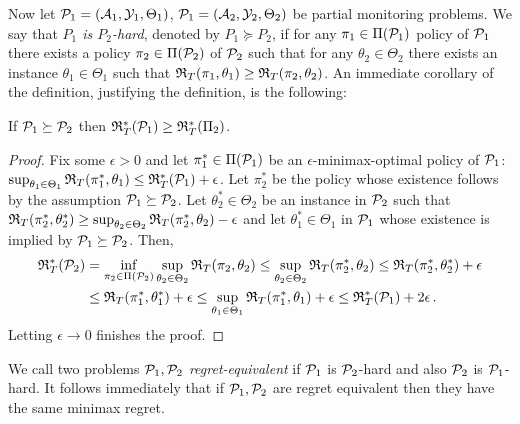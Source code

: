Now let $\P_1 = (\A_1,\Y_1,\Theta_1)$, $\P_1 = (\A_2,\Y_2,\Theta_2)$ be partial monitoring problems.
We say that \emph{$P_1$ is $P_2$-hard}, 
denoted by $P_1 \succeq P_2$, if for any $\pi_1\in \Pi(\P_1)$ policy of $\P_1$ there exists a policy $\pi_2\in \Pi(\P_2)$ of $\P_2$
such that for any $\theta_2\in \Theta_2$ there exists an instance $\theta_1\in \Theta_1$ such that $\Regret_T(\pi_1,\theta_1)\ge \Regret_T(\pi_2,\theta_2)$. An immediate corollary of the definition, justifying the definition, is the following:
\begin{proposition}
If $\P_1\succeq \P_2$ then $\Regret_T^*(\P_1)\ge \Regret_T^*(\Pi_2)$.
\end{proposition}
\begin{proof}
Fix some $\epsilon>0$ and 
let $\pi_1^*\in \Pi(\P_1)$ be an $\epsilon$-minimax-optimal policy of $\P_1$: 
$\sup_{\theta_1\in\Theta_1} \Regret_T(\pi_1^*,\theta_1) \le \Regret_T^*(\P_1)+\epsilon$.
Let $\pi_2^*$ be the policy whose existence follows by the assumption $\P_1\succeq \P_2$.
Let $\theta_2^*\in \Theta_2$ be an instance in $\P_2$ such that 
$\Regret_T(\pi_2^*,\theta_2^*)\ge \sup_{\theta_2\in \Theta_2} \Regret_T(\pi_2^*,\theta_2)-\epsilon$
and let $\theta_1^*\in \Theta_1$ in $\P_1$ whose existence is implied by $\P_1\succeq \P_2$.
Then,
\begin{align*}
 \Regret_T^*(\P_2) &= 
\inf_{\pi_2\in \Pi(\P_2)} \sup_{\theta_2\in \Theta_2} \Regret_T(\pi_2,\theta_2)
\le \sup_{\theta_2\in \Theta_2} \Regret_T(\pi_2^*,\theta_2) 
\le  \Regret_T(\pi_2^*,\theta_2^*)+\epsilon \\
& \le  \Regret_T(\pi_1^*,\theta_1^*)+\epsilon
\le \sup_{\theta_1\in \Theta_1} \Regret_T(\pi_1^*,\theta_1)+\epsilon
\le \Regret_T^*(\P_1) +2\epsilon\,.
\end{align*}
Letting $\epsilon\to 0$ finishes the proof.
\end{proof}
We call two problems \emph{$\P_1,\P_2$ regret-equivalent} if $\P_1$ is $\P_2$-hard and also $\P_2$ is $\P_1$-hard.
It follows immediately that if $\P_1,\P_2$ are regret equivalent then they have the same minimax regret.

